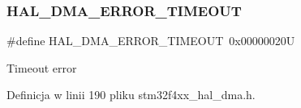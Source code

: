 \subsubsection{\texorpdfstring{H\+A\+L\+\_\+\+D\+M\+A\+\_\+\+E\+R\+R\+O\+R\+\_\+\+T\+I\+M\+E\+O\+UT}{HAL\_DMA\_ERROR\_TIMEOUT}}
{\footnotesize\ttfamily \#define H\+A\+L\+\_\+\+D\+M\+A\+\_\+\+E\+R\+R\+O\+R\+\_\+\+T\+I\+M\+E\+O\+UT~0x00000020U}

Timeout error 

Definicja w linii 190 pliku stm32f4xx\+\_\+hal\+\_\+dma.\+h.


